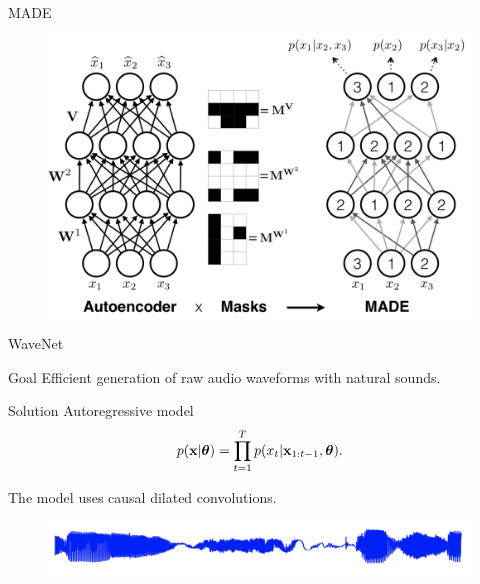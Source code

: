 \begin{frame}{MADE}
\begin{figure}
    \centering
    \includegraphics[width=0.9\linewidth]{figs/made.png}
    \label{fig:made}
\end{figure}
\end{frame}
\begin{frame}{WaveNet}
\begin{block}{Goal}
Efficient generation of raw audio waveforms with natural sounds.
\end{block}
\begin{block}{Solution}
Autoregressive model
\[
    p(\mathbf{x}| \boldsymbol{\theta}) = \prod_{t=1}^T p(x_t|\mathbf{x}_{1:t-1}, \boldsymbol{\theta}).
\]
\end{block}
The model uses causal dilated convolutions.
\begin{figure}
    \centering
    \includegraphics[width=0.9\linewidth]{figs/wavenet_ex.png}
\end{figure}
\end{frame}
